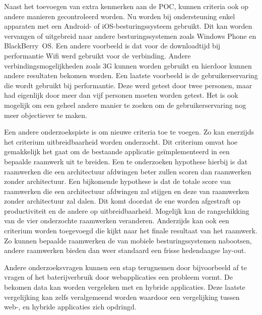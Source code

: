 Naast het toevoegen van extra kenmerken aan de POC, kunnen criteria ook op andere manieren gecontroleerd worden.
Nu worden bij ondersteuning enkel apparaten met een Android- of iOS-besturingssysteem gebruikt.
Dit kan worden vervangen of uitgebreid naar andere besturingssystemen zoals Windows Phone en BlackBerry~OS.
Een andere voorbeeld is dat voor de downloadtijd bij performantie Wifi werd gebruikt voor de verbinding.
Andere verbindingsmogelijkheden zoals 3G kunnen worden gebruikt en hierdoor kunnen andere resultaten bekomen worden.
Een laatste voorbeeld is de gebruikerservaring die wordt gebruikt bij performantie.
Deze werd getest door twee personen, maar had eigenlijk door meer dan vijf personen moeten worden getest.
Het is ook mogelijk om een geheel andere manier te zoeken om de gebruikerservaring nog meer objectiever te maken.

Een andere onderzoekspiste is om nieuwe criteria toe te voegen.
Zo kan enerzijds het criterium uitbreidbaarheid worden onderzocht.
Dit criterium omvat hoe gemakkelijk het gaat om de bestaande applicatie geïmplementeerd in een bepaalde raamwerk uit te breiden.
Een te onderzoeken hypothese hierbij is dat raamwerken die een architectuur afdwingen beter zullen scoren dan raamwerken zonder architectuur.
Een bijkomende hypothese is dat de totale score van raamwerken die een architectuur afdwingen zal stijgen en deze van raamwerken zonder architectuur zal dalen.
Dit komt doordat de ene worden afgestraft op productiviteit en de andere op uitbreidbaarheid.
Mogelijk kan de rangschikking van de vier onderzochte raamwerken veranderen.
Anderzijds kan ook een criterium worden toegevoegd die kijkt naar het finale resultaat van het raamwerk.
Zo kunnen bepaalde raamwerken de  van mobiele besturingssystemen  nabootsen, andere raamwerken bieden dan weer standaard een frisse hedendaagse lay-out.

Andere onderzoeksvragen kunnen een stap terugnemen door bijvoorbeeld af te vragen of het baterijverbruik door webapplicaties een probleem vormt.
De bekomen data kan worden vergeleken met  en hybride applicaties.
Deze laatste vergelijking kan zelfs veralgemeend worden waardoor een vergelijking tussen web-,  en hybride applicaties zich opdringd. 

